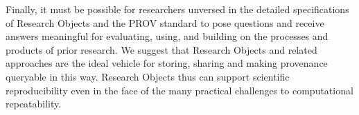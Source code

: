 Finally, it must be possible for researchers unversed in the detailed specifications of Research Objects and the PROV standard
	to pose questions and receive answers meaningful for evaluating, using, and building on the
	processes and products of prior research.
We suggest that Research Objects and related approaches are the ideal vehicle for storing, sharing and making 
	provenance queryable in this way.
Research Objects thus can support scientific reproducibility even in the face of the many practical challenges to 
	computational repeatability.
